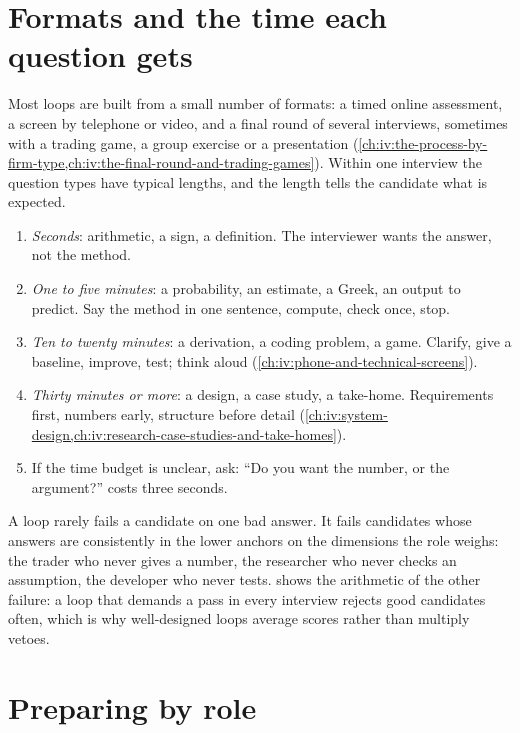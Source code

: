 \section{Formats and the time each question gets}

Most loops are built from a small number of formats: a timed online assessment, a screen by telephone or
video, and a final round of several interviews, sometimes with a trading game, a group exercise or a
presentation (\cref{ch:iv:the-process-by-firm-type,ch:iv:the-final-round-and-trading-games}). Within one
interview the question types have typical lengths, and the length tells the candidate what is expected.

\begin{method}\label{met:iv:what-each-interview-tests-by-role:budget}
\begin{enumerate}
\item \emph{Seconds}: arithmetic, a sign, a definition. The interviewer wants the answer, not the method.
\item \emph{One to five minutes}: a probability, an estimate, a Greek, an output to predict. Say the method in
one sentence, compute, check once, stop.
\item \emph{Ten to twenty minutes}: a derivation, a coding problem, a game. Clarify, give a baseline, improve,
test; think aloud (\cref{ch:iv:phone-and-technical-screens}).
\item \emph{Thirty minutes or more}: a design, a case study, a take-home. Requirements first, numbers early,
structure before detail (\cref{ch:iv:system-design,ch:iv:research-case-studies-and-take-homes}).
\item If the time budget is unclear, ask: ``Do you want the number, or the argument?'' costs three seconds.
\end{enumerate}
\end{method}

A loop rarely fails a candidate on one bad answer. It fails candidates whose answers are consistently in the
lower anchors on the dimensions the role weighs: the trader who never gives a number, the researcher who never
checks an assumption, the developer who never tests.  shows
the arithmetic of the other failure: a loop that demands a pass in every interview rejects good candidates
often, which is why well-designed loops average scores rather than multiply vetoes.

\section{Preparing by role}

